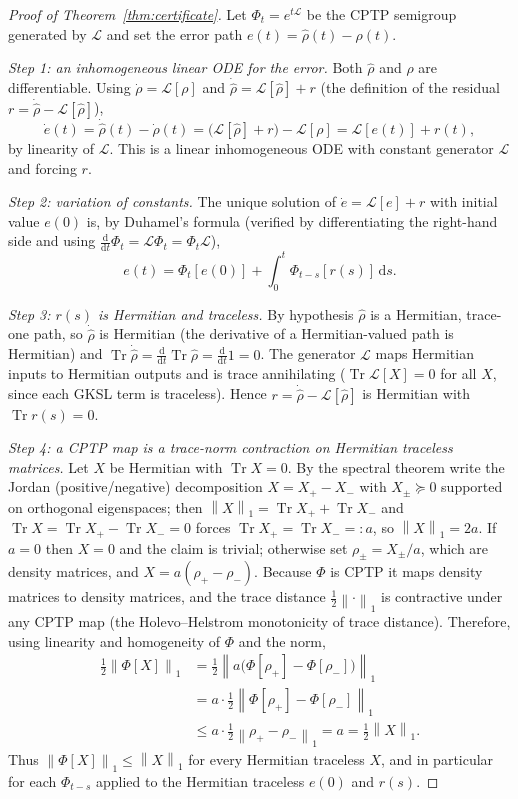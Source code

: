 \documentclass[twocolumn,aps,prxquantum,superscriptaddress,nofootinbib,floatfix,longbibliography]{revtex4-2}
\DeclareMathOperator{\Tr}{Tr}
\newcommand{\calL}{\mathcal{L}}
\newcommand{\dd}{\mathrm{d}}
\newcommand{\norm}[1]{\left\lVert #1 \right\rVert}
\newcommand{\rhohat}{\widehat{\rho}}
\begin{document}
\begin{proof}[Proof of Theorem~\ref{thm:certificate}]
Let $\Phi_t=e^{t\calL}$ be the CPTP semigroup generated by $\calL$ and set the error path $e(t)=\rhohat(t)-\rho(t)$.

\emph{Step 1: an inhomogeneous linear ODE for the error.} Both $\rhohat$ and $\rho$ are differentiable. Using $\dot\rho=\calL[\rho]$ and $\dot\rhohat=\calL[\rhohat]+r$ (the definition of the residual $r=\dot\rhohat-\calL[\rhohat]$),
\[
\dot e(t)=\dot\rhohat(t)-\dot\rho(t)=\big(\calL[\rhohat]+r\big)-\calL[\rho]=\calL[e(t)]+r(t),
\]
by linearity of $\calL$. This is a linear inhomogeneous ODE with constant generator $\calL$ and forcing $r$.

\emph{Step 2: variation of constants.} The unique solution of $\dot e=\calL[e]+r$ with initial value $e(0)$ is, by Duhamel's formula (verified by differentiating the right-hand side and using $\tfrac{\dd}{\dd t}\Phi_t=\calL\Phi_t=\Phi_t\calL$),
\[
e(t)=\Phi_t[e(0)]+\int_0^t\Phi_{t-s}[r(s)]\,\dd s.
\]

\emph{Step 3: $r(s)$ is Hermitian and traceless.} By hypothesis $\rhohat$ is a Hermitian, trace-one path, so $\dot\rhohat$ is Hermitian (the derivative of a Hermitian-valued path is Hermitian) and $\Tr\dot\rhohat=\tfrac{\dd}{\dd t}\Tr\rhohat=\tfrac{\dd}{\dd t}1=0$. The generator $\calL$ maps Hermitian inputs to Hermitian outputs and is trace annihilating ($\Tr\calL[X]=0$ for all $X$, since each GKSL term is traceless). Hence $r=\dot\rhohat-\calL[\rhohat]$ is Hermitian with $\Tr r(s)=0$.

\emph{Step 4: a CPTP map is a trace-norm contraction on Hermitian traceless matrices.} Let $X$ be Hermitian with $\Tr X=0$. By the spectral theorem write the Jordan (positive/negative) decomposition $X=X_+-X_-$ with $X_\pm\succeq0$ supported on orthogonal eigenspaces; then $\norm{X}_1=\Tr X_++\Tr X_-$ and $\Tr X=\Tr X_+-\Tr X_-=0$ forces $\Tr X_+=\Tr X_-=:a$, so $\norm{X}_1=2a$. If $a=0$ then $X=0$ and the claim is trivial; otherwise set $\rho_\pm=X_\pm/a$, which are density matrices, and $X=a(\rho_+-\rho_-)$. Because $\Phi$ is CPTP it maps density matrices to density matrices, and the trace distance $\tfrac12\norm{\cdot}_1$ is contractive under any CPTP map (the Holevo--Helstrom monotonicity of trace distance). Therefore, using linearity and homogeneity of $\Phi$ and the norm,
\begin{equation*}
\begin{aligned}
\tfrac12\norm{\Phi[X]}_1&=\tfrac12\norm{a\big(\Phi[\rho_+]-\Phi[\rho_-]\big)}_1\\
&=a\cdot\tfrac12\norm{\Phi[\rho_+]-\Phi[\rho_-]}_1\\
&\le a\cdot\tfrac12\norm{\rho_+-\rho_-}_1=a=\tfrac12\norm{X}_1.
\end{aligned}
\end{equation*}
Thus $\norm{\Phi[X]}_1\le\norm{X}_1$ for every Hermitian traceless $X$, and in particular for each $\Phi_{t-s}$ applied to the Hermitian traceless $e(0)$ and $r(s)$.


\end{proof}
\end{document}
